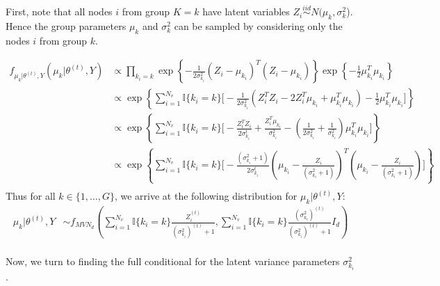 \documentclass{article}
\begin{document}
First, note that all nodes $i$ from group $K = k$ have latent variables $Z_i \overset{iid}\sim N(\mu_k, \sigma_k^2$). Hence the group parameters $\mu_k$ and $\sigma^2_k$ can be sampled by considering only the nodes $i$ from group $k$.

\begin{align*}
f_{\mu_{k}|\theta^{(t)}, Y}(\mu_k|\theta^{(t)},Y) &\propto \prod_{k_i = k} \exp\left\{-\frac{1}{2\sigma_{k_i}^2}(Z_i - \mu_{k_i})^T(Z_i - \mu_{k_i})\right\}\exp\left\{-\frac{1}{2}\mu_{k_i}^T\mu_{k_i}\right\}\\
&\propto \exp\left\{\sum_{i = 1}^{N_v}\mathbb{I}\{k_i = k\} \Big[-\frac{1}{2\sigma_{k_i}^2}(Z_i^TZ_i - 2Z_i^T\mu_{k_i} + \mu_{k_i}^T\mu_{k_i}) - \frac{1}{2}\mu_{k_i}^T\mu_{k_i} \Big]\right\}\\
&\propto\exp\left\{\sum_{i = 1}^{N_v}\mathbb{I}\{k_i = k\} \Big[-\frac{Z_i^TZ_i}{2\sigma_{k_i}^t} + \frac{Z_i^T\mu_{k_i}}{\sigma_{k_i}^2} - \left(\frac{1}{2\sigma_{k_i}^2} + \frac{1}{\sigma_{k_i}^2}\right)\mu_{k_i}^T\mu_{k_i} \Big] \right\}\\
&\propto\exp\left\{\sum_{i = 1}^{N_v}\mathbb{I}\{k_i = k\} \Big[-\frac{(\sigma_{k_i}^2+1)}{2\sigma_{k_i}^t}\left(\mu_{k_i}-\frac{Z_i}{(\sigma_{k_i}^2+1)}\right)^T\left(\mu_{k_i}-\frac{Z_i}{(\sigma_{k_i}^2+1)}\right)\Big]\right\}\\
\end{align*}
Thus for all $k \in \{1, \ldots, G\}$, we arrive at the following distribution for $\mu_k | \theta^{(t)}, Y$:
\begin{align*}
\mu_{k}|\theta^{(t)},Y&\sim f_{{MVN}_d} \left(\sum_{i = 1}^{N_v}\mathbb{I}\{k_i = k\}\frac{Z_i^{(t)}}{(\sigma_{k_i}^2)^{(t)}+1}, \sum_{i = 1}^{N_v}\mathbb{I}\{k_i = k\}\frac{(\sigma_{k_i}^2)^{(t)}}{(\sigma_{k_i}^2)^{(t)}+1}I_d\right)\\
\end{align*}

Now, we turn to finding the full conditional for the latent variance parameters $\sigma_{k_i}^2$. 
\end{document}
